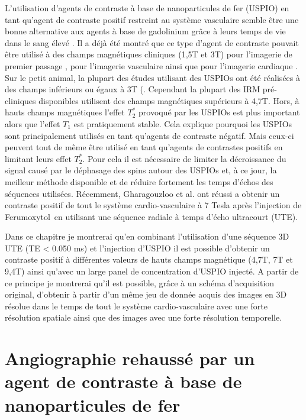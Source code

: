 L'utilisation d'agents de contraste à base de nanoparticules de fer (USPIO) en tant qu'agent de contraste positif restreint au système vasculaire semble être une bonne alternative aux agents à base de gadolinium grâce à leurs temps de vie dans le sang élevé  \cite{Corot:2006fk,Neuwelt:2009aa}.
Il a déjà été montré que ce type d'agent de contraste pouvait être utilisé à des champs magnétiques cliniques (1,5T et 3T) pour l'imagerie de premier passage \cite{Li:2005uq}, pour l'imagerie vasculaire \cite{Sigovan:2009aa,Nayak:2014aa} ainsi que pour l'imagerie cardiaque \cite{Amano:2000aa}.
Sur le petit animal, la plupart des études utilisant des USPIOs ont été réalisées à des champs inférieurs ou égaux à 3T (\cite{Jung:2014aa,Girard:2011ec,Loubeyre:1997aa}. Cependant la plupart des IRM pré-cliniques disponibles utilisent des champs magnétiques supérieurs à 4,7T. Hors, à hauts champs magnétiques l'effet $T_2^*$ provoqué par les USPIOs est plus important alors que l'effet $T_1$ est pratiquement stable. Cela explique pourquoi les USPIOs sont principalement utilisés en tant qu'agents de contraste négatif. Mais ceux-ci peuvent tout de même être utilisé en tant qu'agents de contrastes positifs en limitant leurs effet $T_2^*$. Pour cela il est nécessaire de limiter la décroissance du signal causé par le déphasage des spins autour des USPIOs et, à ce jour, la meilleur méthode disponible et de réduire fortement les temps d'échos des séquences utilisées.
Récemment, Gharagouzloo et al. \cite{Gharagouzloo:2014aa} ont réussi a obtenir un contraste positif de tout le système cardio-vasculaire à 7 Tesla après l'injection de Ferumoxytol\textregistered \ en utilisant une séquence radiale à temps d'écho ultracourt (UTE).

Dans ce chapitre je montrerai qu'en combinant l'utilisation d'une séquence 3D UTE (TE < 0.050 ms) et l'injection d'USPIO il est possible d'obtenir un contraste positif à différentes valeurs de hauts champs magnétique (4,7T, 7T et 9,4T) ainsi qu'avec un large panel de concentration d'USPIO injecté. A partir de ce principe je montrerai qu'il est possible, grâce à un schéma d'acquisition original, d'obtenir à partir d'un même jeu de donnée acquis des images en 3D résolue dans le temps de tout le système cardio-vasculaire avec une forte résolution spatiale ainsi que des images avec une forte résolution temporelle.

\section{Angiographie rehaussé par un agent de contraste à base de nanoparticules de fer}

